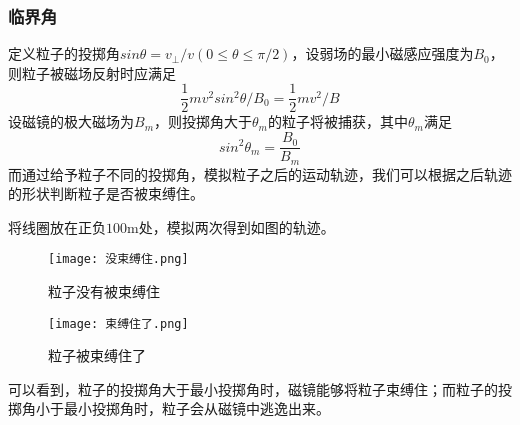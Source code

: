 \documentclass{ctexart}
\begin{document}
\subsubsection{临界角} 
定义粒子的投掷角$sin\theta =v_{\perp}/v(0\le \theta \le \pi/2)$，设弱场的最小磁感应强度为$B_0$，则粒子被磁场反射时应满足
\begin{equation}
    \frac{1}{2} m v^2 sin^2\theta / B_0 = \frac{1}{2} m v^2 / B
\end{equation}
设磁镜的极大磁场为$B_m$，则投掷角大于$\theta_m$的粒子将被捕获，其中$\theta_m$满足
\begin{equation}
    sin^2 \theta_m = \frac{B_0}{B_m}
\end{equation}
而通过给予粒子不同的投掷角，模拟粒子之后的运动轨迹，我们可以根据之后轨迹的形状判断粒子是否被束缚住。
\par  
将线圈放在正负$100\mathrm{m}$处，模拟两次得到如图的轨迹。\par
\begin{figure}[h]
    \centering
    \texttt{[image: 没束缚住.png]}
    \caption{粒子没有被束缚住}
\end{figure}
\begin{figure}[h]
    \centering
    \texttt{[image: 束缚住了.png]}
    \caption{粒子被束缚住了}
\end{figure}
可以看到，粒子的投掷角大于最小投掷角时，磁镜能够将粒子束缚住；而粒子的投掷角小于最小投掷角时，粒子会从磁镜中逃逸出来。
\end{document}
